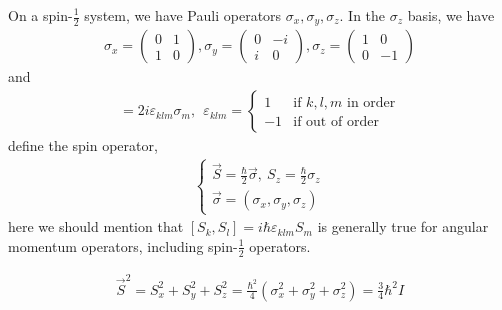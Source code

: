 \documentclass[UTF8,12pt]{article} %
\begin{document}
On a spin-$\frac{1}{2}$ system, we have Pauli operators $\sigma_{x}, \sigma_{y}, \sigma_{z}$. In the $\sigma_{z}$ basis, we have
\begin{align}
\sigma_{x} = \begin{pmatrix}0&1\\1&0\end{pmatrix}, \sigma_{y} = \begin{pmatrix}0&-i\\i&0\end{pmatrix}, \sigma_{z} = \begin{pmatrix}1&0\\0&-1\end{pmatrix}
\end{align}
and
\begin{align}
[\sigma_{k}, \sigma_{l}] = 2i\varepsilon_{klm}\sigma_{m}, ~~\varepsilon_{klm} = \begin{cases}1 &\text{if } k,l,m \text{ in order}\\-1 &\text{if out of order}\end{cases}
\end{align}
define the spin operator,
\begin{align}
\begin{cases}
\vec{S} = \frac{\hbar}{2}\vec{\sigma},~ S_{z} = \frac{\hbar}{2}\sigma_{z}\\
\vec{\sigma} = (\sigma_{x}, \sigma_{y}, \sigma_{z})
\end{cases}
\end{align}
here we should mention that $[S_{k}, S_{l}] = i\hbar\varepsilon_{klm}S_{m}$ is generally true for angular momentum operators, including spin-$\frac{1}{2}$ operators.

\begin{align}
\vec{S}^{2} = S_{x}^{2} + S_{y}^{2} + S_{z}^{2} = \frac{\hbar^{2}}{4} \left(\sigma_{x}^{2} + \sigma_{y}^{2} + \sigma_{z}^{2}\right) = \frac{3}{4} \hbar^{2} I
\end{align}
\end{document}
